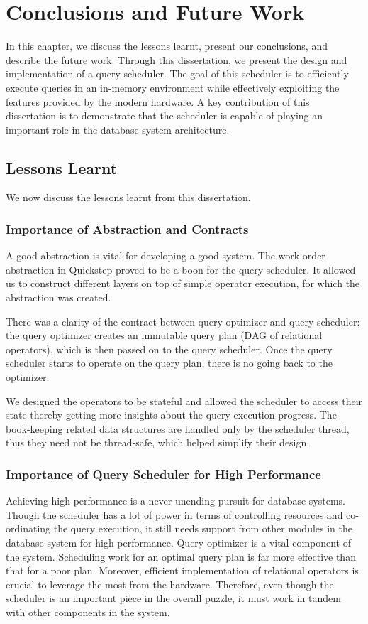 \chapter{Conclusions and Future Work}
In this chapter, we discuss the lessons learnt, present our conclusions, and describe the future work.
Through this dissertation, we present the design and implementation of a query scheduler.
The goal of this scheduler is to efficiently execute queries in an in-memory environment while effectively exploiting the features provided by the modern hardware. 
A key contribution of this dissertation is to demonstrate that the scheduler is capable of playing an important role in the database system architecture.

\section{Lessons Learnt}
We now discuss the lessons learnt from this dissertation.

\subsection{Importance of Abstraction and Contracts}
A good abstraction is vital for developing a good system. 
The work order abstraction in Quickstep proved to be a boon for the query scheduler. 
It allowed us to construct different layers on top of simple operator execution, for which the  abstraction was created. 

There was a clarity of the contract between query optimizer and query scheduler: the query optimizer creates an immutable query plan (DAG of relational operators), which is then passed on to the query scheduler. 
Once the query scheduler starts to operate on the query plan, there is no going back to the optimizer. 

We designed the operators to be stateful and allowed the scheduler to access their state thereby getting more insights about the query execution progress.
The book-keeping related data structures are handled only by the scheduler thread, thus they need not be thread-safe, which helped simplify their design. 

\subsection{Importance of Query Scheduler for High Performance}
Achieving high performance is a never unending pursuit for database systems. 
Though the scheduler has a lot of power in terms of controlling resources and co-ordinating the query execution, it still needs support from other modules in the database system for high performance.
Query optimizer is a vital component of the system. 
Scheduling work for an optimal query plan is far more effective than that for a poor plan. 
Moreover, efficient implementation of relational operators is crucial to leverage the most from the hardware. 
Therefore, even though the scheduler is an important piece in the overall puzzle, it must work in tandem with other components in the system. 

